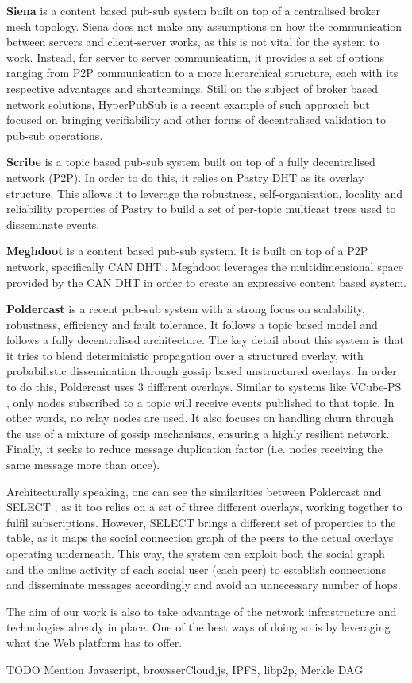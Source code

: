 \textbf{Siena} \cite{Carzaniga2003} is a content based pub-sub system built on
top of a centralised broker mesh topology. Siena does not make any assumptions
on how the communication between servers and client-server works, as this is
not vital for the system to work. Instead, for server to server communication,
it provides a set of options ranging from P2P communication to a more
hierarchical structure, each with its respective advantages and shortcomings.
Still on the subject of broker based network solutions, HyperPubSub
\cite{Zupan2017} is a recent example of such approach but focused on bringing
verifiability and other forms of decentralised validation to pub-sub
operations.

\textbf{Scribe} \cite{Castro2002} is a topic based pub-sub system built
on top of a fully decentralised network (P2P). In order to do this, it
relies on Pastry DHT as its overlay structure. This allows it to
leverage the robustness, self-organisation, locality and reliability
properties of Pastry to build a set of per-topic multicast trees used to disseminate events.

\textbf{Meghdoot} \cite{Gupta2004} is a content based pub-sub system.  It is
built on top of a P2P network, specifically CAN DHT \cite{Ratnasamy2001a}.
Meghdoot leverages the multidimensional space provided by the CAN DHT in order
to create an expressive content based system.

\textbf{Poldercast} \cite{Setty2012} is a recent pub-sub system with a strong
focus on scalability, robustness, efficiency and fault tolerance. It follows a
topic based model and follows a fully decentralised architecture. The key
detail about this system is that it tries to blend deterministic propagation
over a structured overlay, with probabilistic dissemination through gossip
based unstructured overlays. In order to do this, Poldercast uses 3 different
overlays.\cite{Voulgaris2013}\cite{Voulgaris2005a} Similar to systems like
VCube-PS \cite{DeAraujo2017}, only nodes subscribed to a topic will receive
events published to that topic. In other words, no relay nodes are used. It
also focuses on handling churn through the use of a mixture of gossip
mechanisms, ensuring a highly resilient network.  Finally, it seeks to reduce
message duplication factor (i.e. nodes receiving the same message more than
once).

Architecturally speaking, one can see the similarities between Poldercast and
SELECT \cite{Apolonia2018}, as it too relies on a set of three different
overlays, working together to fulfil subscriptions. However, SELECT brings a
different set of properties to the table, as it maps the social connection
graph of the peers to the actual overlays operating underneath. This way, the
system can exploit both the social graph and the online activity of each social
user (each peer) to establish connections and disseminate messages accordingly
and avoid an unnecessary number of hops.

The aim of our work is also to take advantage of the network infrastructure and technologies already in place. One of the best ways of doing so is by leveraging what the Web platform has to offer.

TODO Mention Javascript, browsserCloud,js, IPFS, libp2p, Merkle DAG
